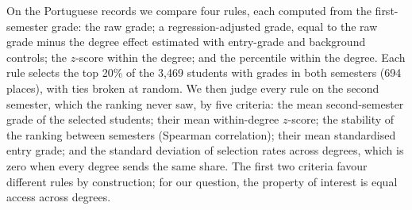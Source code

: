 On the Portuguese records we compare four rules, each computed from the first-semester grade: the raw grade; a regression-adjusted grade, equal to the raw grade minus the degree effect estimated with entry-grade and background controls; the $z$-score within the degree; and the percentile within the degree. Each rule selects the top 20\% of the 3,469 students with grades in both semesters (694 places), with ties broken at random. We then judge every rule on the second semester, which the ranking never saw, by five criteria: the mean second-semester grade of the selected students; their mean within-degree $z$-score; the stability of the ranking between semesters (Spearman correlation); their mean standardised entry grade; and the standard deviation of selection rates across degrees, which is zero when every degree sends the same share. The first two criteria favour different rules by construction; for our question, the property of interest is equal access across degrees.
